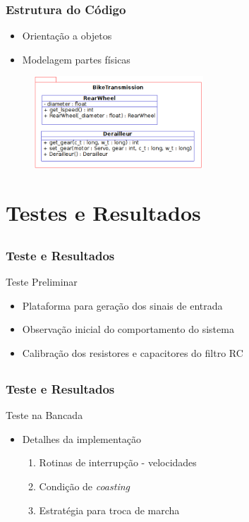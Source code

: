 \documentclass{beamer}
\begin{document}
\begin{frame}
  \frametitle{Estrutura do Código}
  \begin{itemize}
    \item Orientação a objetos
    \item Modelagem partes físicas
  \end{itemize}
  \begin{figure}[h!]
    \begin{center}
      \includegraphics[width=2.5in]{uml}
    \end{center}
  \end{figure}
\end{frame}



\section{Testes e Resultados}
\subsection{}
\begin{frame}
 \frametitle{Teste e Resultados}

Teste Preliminar

  \begin{itemize}
    \item Plataforma para geração dos sinais de entrada
    \item Observação inicial do comportamento do sistema
    \item Calibração dos resistores e capacitores do filtro RC
  \end{itemize}
\end{frame}

\subsection{}
\begin{frame}
 \frametitle{Teste e Resultados}

Teste na Bancada
\begin{itemize}
 \item Detalhes da implementação
    \begin{enumerate}
      \item Rotinas de interrupção - velocidades
      \item Condição de \textit{coasting}
      \item Estratégia para troca de marcha
    \end{enumerate}

\end{itemize}
\end{frame}
\end{document}
